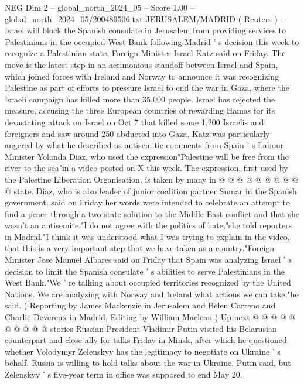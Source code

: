 \begin{textsample}{NEG Dim 2 – global\_north\_2024\_05 – Score 1.00 – global\_north\_2024\_05/200489506.txt}  \label{ex:f2_neg_154}
JERUSALEM/MADRID ( Reuters ) - Israel will block the Spanish consulate in Jerusalem from providing services to Palestinians in the occupied West Bank following Madrid ' s decision this week to recognize a Palestinian state, Foreign Minister Israel Katz said on Friday.
The move is the latest step in an acrimonious standoff between Israel and Spain, which joined forces with Ireland and Norway to announce it was recognizing Palestine as part of efforts to pressure Israel to end the war in Gaza, where the Israeli campaign has killed more than 35,000 people.
Israel has rejected the measure, accusing the three European countries of rewarding Hamas for its devastating attack on Israel on Oct 7 that killed some 1,200 Israelis and foreigners and saw around 250 abducted into Gaza.
Katz was particularly angered by what he described as antisemitic comments from Spain ' s Labour Minister Yolanda Diaz, who used the expression"Palestine will be free from the river to the sea"in a video posted on X this week.
The expression, first used by the Palestine Liberation Organisation, is taken by many in @ @ @ @ @ @ @ @ @ @ state.
Diaz, who is also leader of junior coalition partner Sumar in the Spanish government, said on Friday her words were intended to celebrate an attempt to find a peace through a two-state solution to the Middle East conflict and that she wasn't an antisemite."I do not agree with the politics of hate,"she told reporters in Madrid."I think it was understood what I was trying to explain in the video, that this is a very important step that we have taken as a country."Foreign Minister Jose Manuel Albares said on Friday that Spain was analyzing Israel ' s decision to limit the Spanish consulate ' s abilities to serve Palestinians in the West Bank."We ' re talking about occupied territories recognized by the United Nations.
We are analyzing with Norway and Ireland what actions we can take,"he said. ( Reporting by James Mackenzie in Jerusalem and Belen Carreno and Charlie Devereux in Madrid, Editing by William Maclean ) Up next @ @ @ @ @ @ @ @ @ @ stories Russian President Vladimir Putin visited his Belarusian counterpart and close ally for talks Friday in Minsk, after which he questioned whether Volodymyr Zelenskyy has the legitimacy to negotiate on Ukraine ' s behalf.
Russia is willing to hold talks about the war in Ukraine, Putin said, but Zelenskyy ' s five-year term in office was supposed to end May 20.

\end{textsample}
